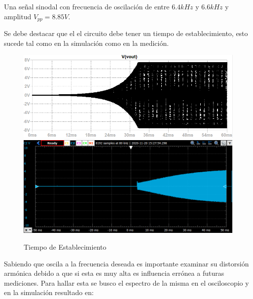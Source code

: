 Una señal sinodal con frecuencia de oscilación de entre $6.4kHz$ y $6.6kHz$ y amplitud $V_{pp} = 8.85V$.

Se debe destacar que el el circuito debe tener un tiempo de establecimiento, esto sucede tal como en la simulación como en la medición.

\begin{figure}[H]
    \centering
    \includegraphics[scale = 0.7]{../2-OscFase/Informe/testab.PNG}
    \includegraphics[scale = 0.63]{../2-OscFase/Informe/oscdefa6k.png}
    \caption{Tiempo de Establecimiento}
    \label{ej2tes}
\end{figure}

Sabiendo que oscila a la frecuencia deseada es importante examinar su distorsión armónica debido a que si esta es muy alta es influencia errónea a futuras mediciones. Para hallar esta se busco el espectro de la misma en el osciloscopio y en la simulación resultado en:

